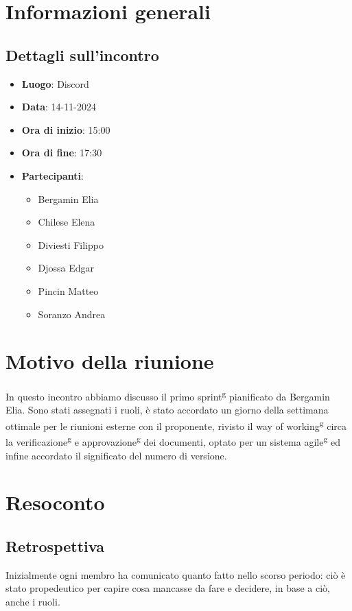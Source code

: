 \section{Informazioni generali}
\subsection{Dettagli sull'incontro}
\begin{itemize}
    \item \textbf{Luogo}: Discord
    \item \textbf{Data}: 14-11-2024
    \item \textbf{Ora di inizio}: 15:00
    \item \textbf{Ora di fine}: 17:30
    \item \textbf{Partecipanti}:
          \begin{itemize}
              \item Bergamin Elia
              \item Chilese Elena
              \item Diviesti Filippo
              \item Djossa Edgar
              \item Pincin Matteo
              \item Soranzo Andrea
          \end{itemize}
\end{itemize}

\section{Motivo della riunione}
In questo incontro abbiamo discusso il primo sprint\textsuperscript{g}
pianificato da Bergamin Elia. Sono stati assegnati i ruoli, è stato accordato
un giorno della settimana ottimale per le riunioni esterne con il proponente,
rivisto il way of working\textsuperscript{g} circa la
verificazione\textsuperscript{g} e approvazione\textsuperscript{g} dei
documenti, optato per un sistema agile\textsuperscript{g} ed infine accordato
il significato del numero di versione.
\section{Resoconto}
\subsection{Retrospettiva}
Inizialmente ogni membro ha comunicato quanto fatto nello scorso periodo: ciò è
stato propedeutico per capire cosa mancasse da fare e decidere, in base a ciò,
anche i ruoli.
